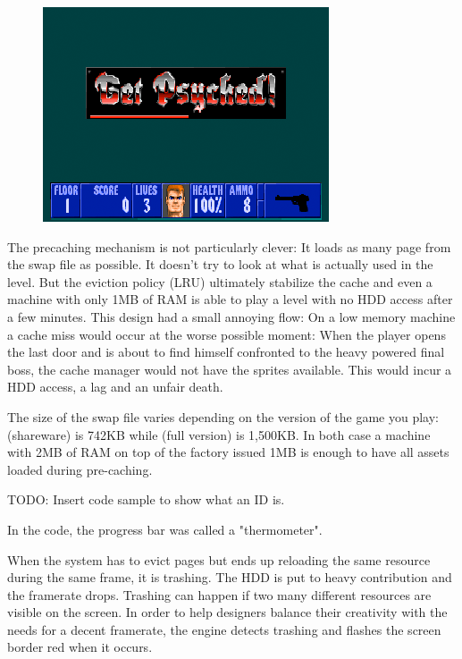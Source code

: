 \documentclass[book.tex]{subfiles}
\begin{document}
\begin{figure}[H]
\centering
 \includegraphics[width=\textwidth]{screenshots/get_psyched.png}
 \end{figure}
 \par
The precaching mechanism is not particularly clever: It loads as many page from the swap file as possible. It doesn't try to look at what is actually used in the level. But the eviction policy (LRU) ultimately stabilize the cache and even a machine with only 1MB of RAM is able to play a level with no HDD access after a few minutes. This design had a small annoying flow: On a low memory machine a cache miss would occur at the worse possible moment: When the player opens the last door and is about to find himself confronted to the heavy powered final boss, the cache manager would not have the sprites available. This would incur a HDD access, a lag and an unfair death.\\
\par
The size of the swap file varies depending on the version of the game you play:  (shareware) is 742KB while  (full version) is 1,500KB. In both case a machine with 2MB of RAM on top of the factory issued 1MB is enough to have all assets loaded during pre-caching.\\
\par
TODO: Insert code sample to show what an ID is.
\par
{} In the code, the progress bar was called a "thermometer".\\
\par
{} When the system has to evict pages but ends up reloading the same resource during the same frame, it is trashing. The HDD is put to heavy contribution and the framerate drops. Trashing can happen if two many different resources are visible on the screen. In order to help designers balance their creativity with the needs for a decent framerate, the engine detects trashing and flashes the screen border red when it occurs.\\
\end{document}
